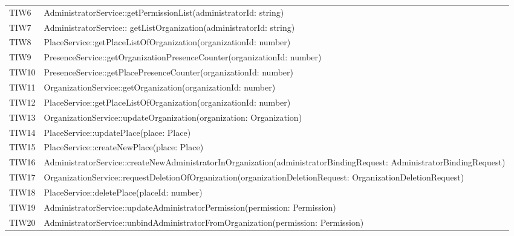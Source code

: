 {\begin{longtable}{C{2cm} C{12cm}}
	TIW6 & AdministratorService::getPermissionList(administratorId: string)\\
	TIW7 & AdministratorService:: getListOrganization(administratorId: string)\\
	TIW8 & PlaceService::getPlaceListOfOrganization(organizationId: number)\\
	TIW9 & PresenceService::getOrganizationPresenceCounter(organizationId: number)\\
	TIW10 & PresenceService::getPlacePresenceCounter(organizationId: number)\\
	TIW11 & OrganizationService::getOrganization(organizationId: number)\\
	TIW12 & PlaceService::getPlaceListOfOrganization(organizationId: number)\\
	TIW13 & OrganizationService::updateOrganization(organization: Organization)\\
	TIW14 & PlaceService::updatePlace(place: Place)\\
	TIW15 & PlaceService::createNewPlace(place: Place)\\
	TIW16 & AdministratorService::createNewAdministratorInOrganization(administratorBindingRequest: AdministratorBindingRequest)\\
	TIW17 & OrganizationService::requestDeletionOfOrganization(organizationDeletionRequest: OrganizationDeletionRequest)\\
	TIW18 & PlaceService::deletePlace(placeId: number)\\
	TIW19 & AdministratorService::updateAdministratorPermission(permission: Permission)\\
	TIW20 & AdministratorService::unbindAdministratorFromOrganization(permission: Permission)\\


\end{longtable}
}